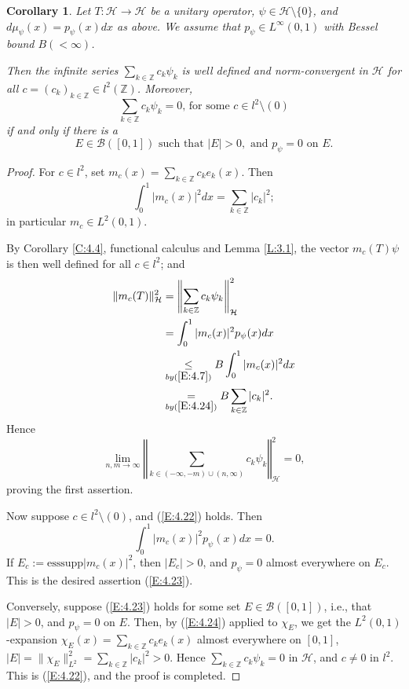 \documentclass{birkmult}
\newtheorem{cor}[thm]{Corollary}
\theoremstyle{definition}
\theoremstyle{remark}
\numberwithin{equation}{section}
\begin{document}
\begin{cor}
\label{C:4.5}
Let $T: \mathcal{H} \to \mathcal{H}$ be a unitary operator, 
$\psi \in \mathcal{H} \setminus \{0\}$, and $d\mu_{\psi}(x)=p_{\psi}(x)dx$ as 
above.  We assume that $p_{\psi} \in L^{\infty}(0,1)$ with Bessel bound 
$B(<\infty)$. 

Then the infinite series $\sum_{k \in \mathbb{Z}} c_{k}\psi_{k}$ is well 
defined and norm-convergent in $\mathcal{H}$ for all 
$c=(c_{k})_{k \in \mathbb{Z}} \in l^{2}(\mathbb{Z})$.  Moreover,
\begin{equation}
\label{E:4.22}
  \sum_{k \in \mathbb{Z}} c_{k}\psi_{k} = 0 \text{, for some } 
  c \in l^{2} \setminus (0)
\end{equation}
if and only if there is a 
\begin{equation}
\label{E:4.23}
  E \in \mathcal{B}([0,1]) \text{ such that } |E|>0, \text{ and }
  p_{\psi}=0 \text{ on } E.
\end{equation}
\end{cor}
\begin{proof}
For $c \in l^{2}$, set $m_{c}(x)=\sum_{k \in \mathbb{Z}} c_{k}e_{k}(x)$.
Then
\begin{equation}
\label{E:4.24}
  \int_{0}^{1}|m_{c}(x)|^{2}dx=\sum_{k \in \mathbb{Z}} |c_{k}|^{2}; 
\end{equation}
in particular $m_{c} \in L^{2}(0,1)$.

By Corollary \ref{C:4.4}, functional calculus and Lemma \ref{L:3.1}, the 
vector $m_{c}(T)\psi$ is then well defined for all $c \in l^{2}$; and 
\begin{align*}
  \|m_{c}(T)\|_{\mathcal{H}}^{2} 
  &= \left\Vert \sum_{k \in \mathbb{Z}} c_{k}\psi_{k}\right\Vert_{\mathcal{H}}^{2} \\
  &= \int_{0}^{1}|m_{c}(x)|^{2}p_{\psi}(x)dx  \\
  &\underset{by (\ref{E:4.7})}{\leq} B\int_{0}^{1}|m_{c}(x)|^{2}dx \\
  &\underset{by (\ref{E:4.24})}{=} B\sum_{k \in \mathbb{Z}} |c_{k}|^{2}.
\end{align*}
Hence 
\[
  \lim_{n, m \to \infty}\left\Vert\sum_{k \in (-\infty, -m) \cup (n, \infty)}
c_{k}\psi_{k}\right\Vert_{\mathcal{H}}^{2} = 0, 
\]
proving the first assertion. 

Now suppose $c \in l^{2} \setminus (0)$, and (\ref{E:4.22}) holds.  Then 
\[
  \int_{0}^{1}|m_{c}(x)|^{2}p_{\psi}(x)dx = 0.
\]
If $E_{c}:= \text{esssupp}|m_{c}(x)|^{2}$, then $|E_{c}|>0$, and 
$p_{\psi}=0$ almost everywhere on $E_{c}$.  This is the desired assertion 
(\ref{E:4.23}).

Conversely, suppose (\ref{E:4.23}) holds for some set 
$E \in \mathcal{B}([0,1])$, i.e., that $|E|>0$, and $p_{\psi}=0$ on $E$.
Then, by (\ref{E:4.24}) applied to $\chi_{E}$, we get the 
$L^{2}(0,1)$-expansion 
$\chi_{E}(x) = \sum_{k \in \mathbb{Z}} c_{k}e_{k}(x)$ almost everywhere on 
$[0,1]$, 
$|E|=\|\chi_{E}\|_{L^{2}}^{2}=\sum_{k \in \mathbb{Z}} |c_{k}|^{2}>0$.
Hence $\sum_{k \in \mathbb{Z}} c_{k}\psi_{k} = 0$ in $\mathcal{H}$, 
and $c \neq 0$ in $l^{2}$.  This is (\ref{E:4.22}), and the proof is completed.
\end{proof}
\end{document}
